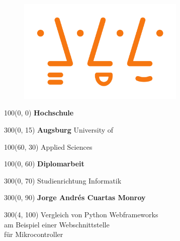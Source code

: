 \begin{titlepage}
\begin{figure}[htb]
\centering
\includegraphics[width=8cm]{images/hsaugsburglogo.png}
\label{Logo}
\end{figure}

\setlength{\TPHorizModule}{1mm}
\setlength{\TPVertModule}{1mm}


\begin{textblock}{100}(0, 0)
\fontsize{60}{15}
\selectfont
\textbf{Hochschule} 
\end{textblock}

\begin{textblock}{300}(0, 15)
\fontsize{50}{15}
\selectfont
\textbf{Augsburg} University of 
\end{textblock}

\begin{textblock}{100}(60, 30)
\fontsize{50}{15}
\selectfont
Applied Sciences 
\end{textblock}

\begin{textblock}{100}(0, 60)
\fontsize{30}{15}
\selectfont 
\textbf{Diplomarbeit} 
\end{textblock}

\begin{textblock}{300}(0, 70)
\fontsize{20}{15}
\selectfont 
Studienrichtung Informatik 
\end{textblock}

\begin{textblock}{300}(0, 90)
\fontsize{20}{15}
\selectfont 
\textbf{Jorge Andrés Cuartas Monroy}
\end{textblock}

\begin{textblock}{300}(4, 100)
\fontsize{20}{20}
\selectfont 
\parindent0mm
Vergleich von Python Webframeworks\\
am Beispiel einer Webschnittstelle\\
für Mikrocontroller
\end{textblock}


\end{titlepage}
